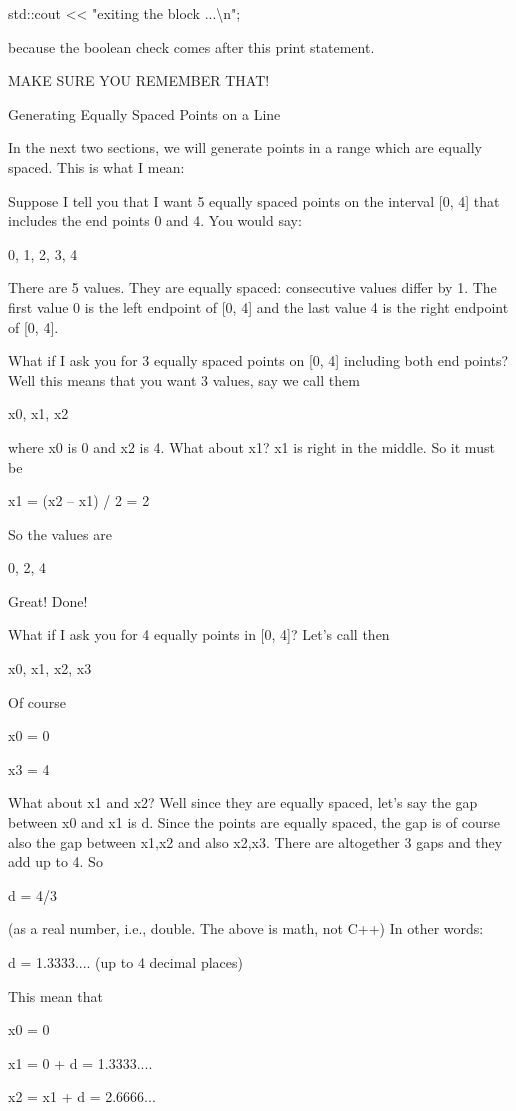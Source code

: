 \documentclass[
]{article}
\begin{document}
std::cout \textless\textless{} "exiting the block ...\textbackslash n";

because the boolean check comes after this print statement.

MAKE SURE YOU REMEMBER THAT!

Generating Equally Spaced Points on a Line

In the next two sections, we will generate points in a range which are
equally spaced. This is what I mean:

Suppose I tell you that I want 5 equally spaced points on the interval
{[}0, 4{]} that includes the end points 0 and 4. You would say:

0, 1, 2, 3, 4

There are 5 values. They are equally spaced: consecutive values differ
by 1. The first value 0 is the left endpoint of {[}0, 4{]} and the last
value 4 is the right endpoint of {[}0, 4{]}.

What if I ask you for 3 equally spaced points on {[}0, 4{]} including
both end points? Well this means that you want 3 values, say we call
them

x0, x1, x2

where x0 is 0 and x2 is 4. What about x1? x1 is right in the middle. So
it must be

x1 = (x2 -- x1) / 2 = 2

So the values are

0, 2, 4

Great! Done!

What if I ask you for 4 equally points in {[}0, 4{]}? Let's call then

x0, x1, x2, x3

Of course

x0 = 0

x3 = 4

What about x1 and x2? Well since they are equally spaced, let's say the
gap between x0 and x1 is d. Since the points are equally spaced, the gap
is of course also the gap between x1,x2 and also x2,x3. There are
altogether 3 gaps and they add up to 4. So

d = 4/3

(as a real number, i.e., double. The above is math, not C++) In other
words:

d = 1.3333.... (up to 4 decimal places)

This mean that

x0 = 0

x1 = 0 + d = 1.3333....

x2 = x1 + d = 2.6666...
\end{document}
